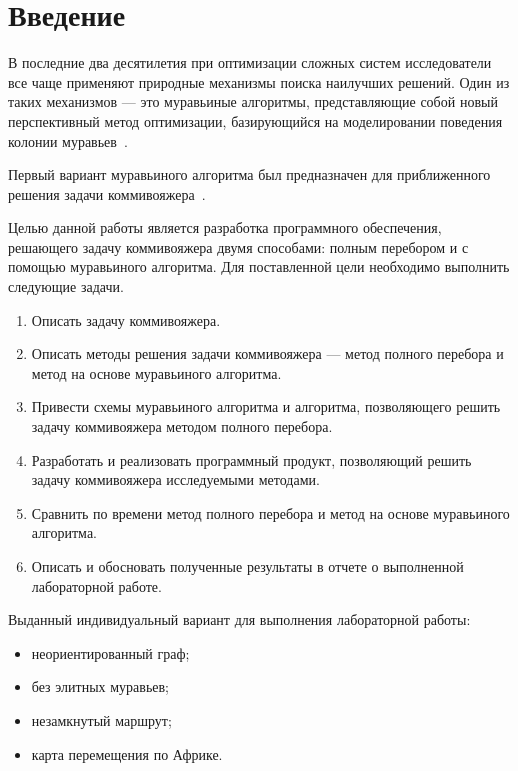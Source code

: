 \chapter*{Введение}

В последние два десятилетия при оптимизации сложных систем исследователи все чаще применяют природные механизмы поиска наилучших решений. 
Один из таких механизмов --- это муравьиные алгоритмы, представляющие собой новый перспективный метод оптимизации, базирующийся на моделировании поведения колонии муравьев~\cite{shtovba}. 

Первый вариант муравьиного алгоритма был предназначен для приближенного решения задачи коммивояжера~\cite{ershov}. 

Целью данной работы является разработка программного обеспечения, решающего задачу коммивояжера двумя способами: полным перебором и с помощью муравьиного алгоритма.
Для поставленной цели необходимо выполнить следующие задачи.
\begin{enumerate}
	\item Описать задачу коммивояжера.
	\item Описать методы решения задачи коммивояжера --- метод полного перебора и метод на основе муравьиного алгоритма.
	\item Привести схемы муравьиного алгоритма и алгоритма, позволяющего решить задачу коммивояжера методом полного перебора.
	\item Разработать и реализовать программный продукт, позволяющий решить задачу коммивояжера исследуемыми методами.
	\item Сравнить по времени метод полного перебора и метод на основе муравьиного алгоритма.
	\item Описать и обосновать полученные результаты в отчете о выполненной лабораторной работе.
\end{enumerate}

Выданный индивидуальный вариант для выполнения лабораторной работы:
\begin{itemize}
	\item неориентированный граф;
	\item без элитных муравьев;
	\item незамкнутый маршрут;
	\item карта перемещения по Африке.
\end{itemize}